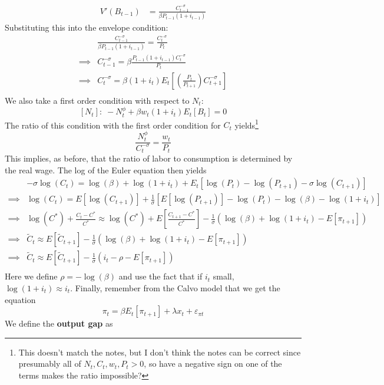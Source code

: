 \documentclass[12pt]{article}
\begin{document}
\begin{itemize}
\[\begin{split}
        V'(B_{t-1}) &= \frac{C_{t-1}^{-\sigma}}{\beta P_{t-1}(1+i_{t-1})}
    \end{split}\]
    Substituting this into the envelope condition:
    \[\begin{split}
        &\frac{C_{t-1}^{-\sigma}}{\beta P_{t-1}(1+i_{t-1})} = \frac{C_t^{-\sigma}}{P_t} \\
        \implies &C_{t-1}^{-\sigma} = \beta \frac{P_{t-1}(1+i_{t-1})C_t^{-\sigma}}{P_t} \\
        \implies &C_t^{-\sigma} = \beta(1+i_t) E_t\left[\left(\frac{P_t}{P_{t+1}}\right)C_{t+1}^{-\sigma}\right] \\
    \end{split}\]
    We also take a first order condition with respect to $N_t$:
    \[[N_t]:\; -N_t^{\phi} +\beta w_t(1+i_t)E_t[B_t] = 0\]
    The ratio of this condition with the first order condition for $C_t$ yields\footnote{This doesn't match the notes, but I don't think the notes can be correct since presumably all of $N_t,C_t,w_t,P_t > 0$, so have a negative sign on one of the terms makes the ratio impossible?}
    \[\frac{N_t^{\phi}}{C_t^{-\sigma}} = \frac{w_t}{P_t}\]
    This implies, as before, that the ratio of labor to consumption is determined by the real wage. The log of the Euler equation then yields
    \[\begin{split}
        &-\sigma \log(C_t) = \log(\beta) + \log(1+i_t) + E_t\left[\log(P_t) - \log(P_{t+1}) -\sigma \log(C_{t+1})\right] \\
        \implies &\log(C_t) = E[\log(C_{t+1})] + \frac{1}{\sigma}\left[E[\log(P_{t+1})] - \log(P_t) -\log(\beta)-\log(1+i_t)\right] \\
        \implies &\log(C^*) + \frac{C_t-C^*}{C^*} \approx \log(C^*) + E\left[\frac{C_{t+1}-C^*}{C^*}\right] - \frac{1}{\sigma}\left(\log(\beta) + \log(1+i_t) - E[\pi_{t+1}]\right) \\
        \implies &\widetilde{C}_t \approx E[\widetilde{C}_{t+1}] - \frac{1}{\sigma}\left(\log(\beta) + \log(1+i_t) - E[\pi_{t+1}]\right) \\
        \implies &\widetilde{C}_t \approx E[\widetilde{C}_{t+1}] - \frac{1}{\sigma}\left(i_t - \rho - E[\pi_{t+1}]\right) \\
    \end{split}\]
    Here we define $\rho = -\log(\beta)$ and use the fact that if $i_t$ small, $\log(1+i_t) \approx i_t$. Finally, remember from the Calvo model that we get the equation
    \[\pi_t = \beta E_t[\pi_{t+1}] + \lambda x_t + \varepsilon_{\pi t}\]
    We define the \textbf{output gap} as

\end{itemize}
\end{document}
